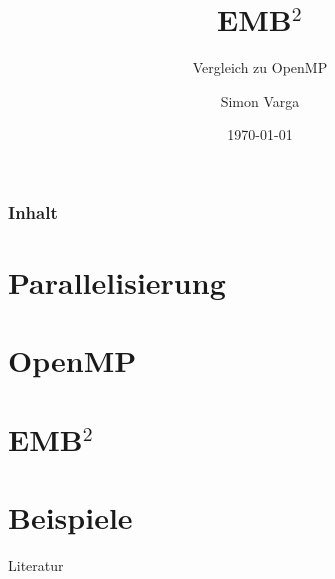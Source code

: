 \documentclass[unknownkeysallowed,14pt]{beamer}
\title{EMB$ ^2$}
\subtitle{Vergleich zu OpenMP}
\date{\today}
\author{Simon Varga}
\institute[THI]{Technische Hochschule Ingolstadt}
\newcounter{ct}
\begin{document}

	

	\begin{frame}[plain]
		\titlepage
	\end{frame}
	
	\begin{frame}
		\frametitle{Inhalt}
	    \tableofcontents[hideallsubsections]
	\end{frame}
	
	\section{Parallelisierung}
	
	
	\section{OpenMP}
	
	
	\section{EMB$ ^2$}
	
	
	\section{Beispiele}
	
	
	\nocite{lehmann}
	\nocite{kohlhauser}
	\nocite{probst}
	
	
	\begin{frame}{Literatur}
		\small
		
	\end{frame}
\end{document}
